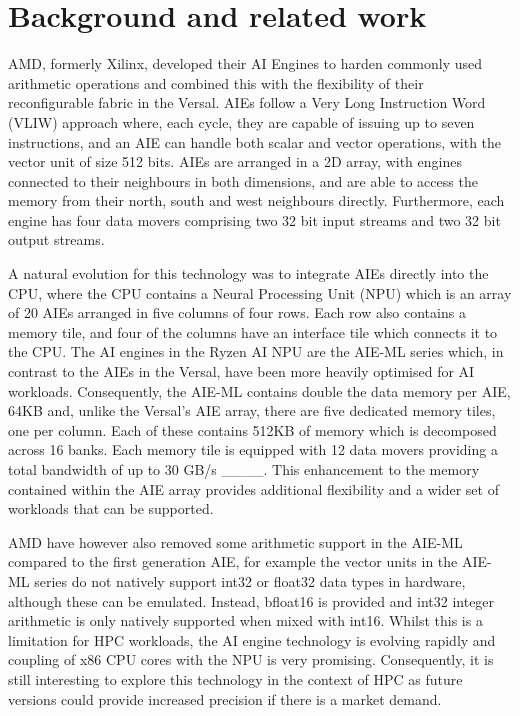 \section{Background and related work}
\label{sec:bg}


AMD, formerly Xilinx, developed their AI Engines to harden commonly used arithmetic operations and combined this with the flexibility of their reconfigurable fabric in the Versal. AIEs follow a Very Long Instruction Word (VLIW) approach where, each cycle, they are capable of issuing up to seven instructions, and an AIE can handle both scalar and vector operations, with the vector unit of size 512 bits. AIEs are arranged in a 2D array, with engines connected to their neighbours in both dimensions, and are able to access the memory from their north, south and west neighbours directly. Furthermore, each engine has four data movers comprising two 32 bit input streams and two 32 bit output streams.

A natural evolution for this technology was to integrate AIEs directly into the CPU, where the CPU contains a Neural Processing Unit (NPU) which is an array of 20 AIEs arranged in five columns of four rows. Each row also contains a memory tile, and four of the columns have an interface tile which connects it to the CPU. The AI engines in the Ryzen AI NPU are the AIE-ML series which, in contrast to the AIEs in the Versal, have been more heavily optimised for AI workloads. Consequently, the AIE-ML contains double the data memory per AIE, 64KB and, unlike the Versal's AIE array, there are five dedicated memory tiles, one per column. Each of these contains 512KB of memory which is decomposed across 16 banks. Each memory tile is equipped with 12 data movers providing a total bandwidth of up to 30 GB/s ____. This enhancement to the memory contained within the AIE array provides additional flexibility and a wider set of workloads that can be supported.

AMD have however also removed some arithmetic support in the AIE-ML compared to the first generation AIE, for example the vector units in the AIE-ML series do not natively support int32 or float32 data types in hardware, although these can be emulated. Instead, bfloat16 is provided and int32 integer arithmetic is only natively supported when mixed with int16. Whilst this is a limitation for HPC workloads, the AI engine technology is evolving rapidly and coupling of x86 CPU cores with the NPU is very promising. Consequently, it is still interesting to explore this technology in the context of HPC as future versions could provide increased precision if there is a market demand.

